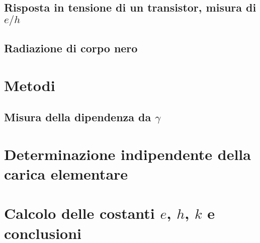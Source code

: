 \documentclass[a4paper, varvw, nofootinbib]{revtex4-2}
\begin{document}
\subsection{Risposta in tensione di un transistor, misura di $e/h$}

\subsection{Radiazione di corpo nero}

\section{Metodi}\label{sec:black_body_methods}

\subsection{Misura della dipendenza da $\gamma$}

\section{Determinazione indipendente della carica elementare}\label{sec:millikan}

\section{Calcolo delle costanti $e$, $h$, $k$ e conclusioni}\label{sec:combined_data}


\end{document}
